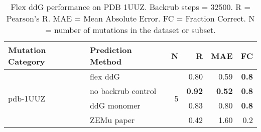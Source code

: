 \begin{table}
  \begin{tabular}{llrrrr}
\toprule
Mutation Category &   Prediction Method &  N &    R &  MAE &  FC \\
\midrule
 \multirow{ 4}{*}{pdb-1UUZ} & flex ddG & \multirow{ 4}{*}{5} & 0.80 & 0.59 & \textbf{0.8}  \\
 & no backrub control & & \textbf{0.92} & \textbf{0.52} & \textbf{0.8}  \\
 & ddG monomer & & 0.83 & 0.80 & \textbf{0.8}  \\
 & ZEMu paper & & 0.42 & 1.60 & 0.2  \\
\bottomrule
\end{tabular}
  \caption[Flex ddG performance on PDB 1UUZ]{
    Flex ddG performance on PDB 1UUZ. Backrub steps = 32500. R = Pearson's R. MAE = Mean Absolute Error. FC = Fraction Correct. N = number of mutations in the dataset or subset.
  } \label{tab:table-pdb-1UUZ}
\end{table}
